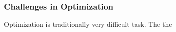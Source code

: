 \subsubsection{Challenges in Optimization}

Optimization is traditionally very difficult task. The the 
